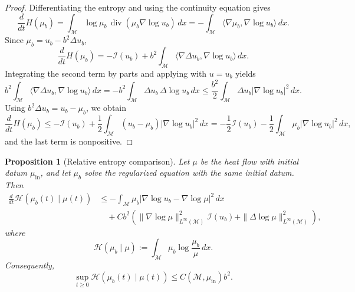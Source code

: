 \documentclass[11pt]{article}
\newtheorem{proposition}[theorem]{Proposition}
\theoremstyle{definition}
\newcommand{\divg}{\operatorname{div}}
\def\M{\mathcal M}
\begin{document}
\begin{proof}
Differentiating the entropy and using the continuity equation gives
\[
\frac{d}{dt}H(\mu_b)
=
\int_\M \log\mu_b\,\divg(\mu_b\nabla\log u_b)\,dx
=
-\int_\M \langle\nabla\mu_b,\nabla\log u_b\rangle\,dx .
\]
Since $\mu_b=u_b-b^2\Delta u_b$,
\[
\frac{d}{dt}H(\mu_b)
=
-\mathcal I(u_b)
+b^2\int_\M \langle\nabla\Delta u_b,\nabla\log u_b\rangle\,dx .
\]
Integrating the second term by parts and applying
 with $u=u_b$ yields
\[
b^2\int_\M \langle\nabla\Delta u_b,\nabla\log u_b\rangle\,dx
=
-b^2\int_\M \Delta u_b\,\Delta\log u_b\,dx
\le
\frac{b^2}{2}\int_\M \Delta u_b|\nabla\log u_b|^2\,dx .
\]
Using $b^2\Delta u_b=u_b-\mu_b$, we obtain
\[
\frac{d}{dt}H(\mu_b)
\le
-\mathcal I(u_b)
+\frac12\int_\M (u_b-\mu_b)|\nabla\log u_b|^2\,dx
=
-\frac12\mathcal I(u_b)
-\frac12\int_\M \mu_b|\nabla\log u_b|^2\,dx ,
\]
and the last term is nonpositive.
\end{proof}

\begin{proposition}[Relative entropy comparison]\label{prop:relative_entropy_convergence}
Let $\mu$ be the heat flow with initial datum $\mu_{\mathrm{in}}$, and let $\mu_b$ solve
the regularized equation with the same initial datum.  Then
\begin{align*}
\frac{d}{dt}\mathcal H(\mu_b(t)\mid\mu(t))
&\le
-\int_\M
\mu_b|\nabla\log u_b-\nabla\log\mu|^2\,dx
\\
&\quad
+Cb^2\left(
\|\nabla\log\mu\|_{L^\infty(\M)}^2\mathcal I(u_b)
+\|\Delta\log\mu\|_{L^\infty(\M)}^2
\right),
\end{align*}
where
\[
\mathcal H(\mu_b\mid\mu)
:=
\int_\M \mu_b\log\frac{\mu_b}{\mu}\,dx .
\]
Consequently,
\[
\sup_{t\ge0}\mathcal H(\mu_b(t)\mid\mu(t))
\le
C(\M,\mu_{\mathrm{in}})b^2 .
\]
\end{proposition}
\end{document}
